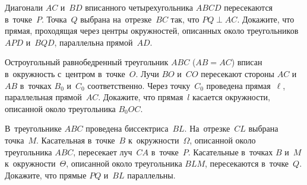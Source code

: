 


\begin{problems}



\item
Диагонали $AC$ и~$BD$ вписанного четырехугольника $ABCD$ пересекаются
в~точке~$P$.
Точка~$Q$ выбрана на~отрезке~$BC$ так, что $PQ \perp AC$.
Докажите, что прямая, проходящая через центры окружностей, описанных около
треугольников $APD$ и~$BQD$, параллельна прямой~$AD$.

\item
Остроугольный равнобедренный треугольник $ABC$ ($AB = AC$) вписан в~окружность
с~центром в~точке~$O$.
Лучи $BO$ и~$CO$ пересекают стороны $AC$ и~$AB$ в~точках $B_0$ и~$C_0$
соответственно.
Через точку~$C_0$ проведена прямая~$\ell$, параллельная прямой~$AC$.
Докажите, что прямая~$l$ касается окружности, описанной около
треугольника $B_{0}OC$.

\item
В~треугольнике $ABC$ проведена биссектриса~$BL$.
На~отрезке~$CL$ выбрана точка~$M$.
Касательная в~точке~$B$ к~окружности~$\Omega$, описанной около
треугольника $ABC$, пересекает луч~$CA$ в~точке~$P$.
Касательные в~точках $B$ и~$M$ к~окружности~$\Theta$, описанной около
треугольника $BLM$, пересекаются в~точке~$Q$.
Докажите, что прямые $PQ$ и~$BL$ параллельны.


\end{problems}
